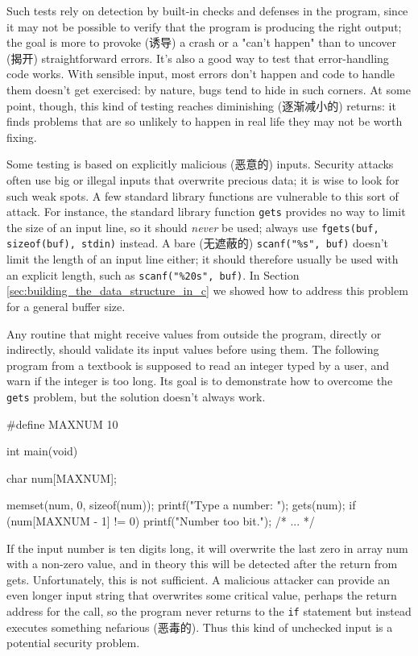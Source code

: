 Such tests rely on detection by built-in checks and defenses in the
program, since it may not be possible to verify that the program is
producing the right output; the goal is more to provoke (诱导) a crash or a
"can't happen" than to uncover (揭开) straightforward errors. It's also a
good way to test that error-handling code works. With sensible input, most
errors don't happen and code to handle them doesn't get exercised: by
nature, bugs tend to hide in such corners. At some point, though, this kind
of testing reaches diminishing (逐渐减小的) returns: it finds problems that
are so unlikely to happen in real life they may not be worth fixing.

Some testing is based on explicitly malicious (恶意的) inputs. Security
attacks often use big or illegal inputs that overwrite precious data; it is
wise to look for such weak spots. A few standard library functions are
vulnerable to this sort of attack. For instance, the standard library
function \verb'gets' provides no way to limit the size of an input line, so
it should \emph{never} be used; always use
\verb'fgets(buf, sizeof(buf), stdin)'
instead. A bare (无遮蔽的) \verb'scanf("%s", buf)' doesn't limit
the length of an input line either; it should therefore usually be used
with an explicit length, such as \verb'scanf("%20s", buf)'. In Section
\ref{sec:building_the_data_structure_in_c} we showed how to address this
problem for a general buffer size.

Any routine that might receive values from outside the program, directly or
indirectly, should validate its input values before using them. The
following program from a textbook is supposed to read an integer typed by a
user, and warn if the integer is too long. Its goal is to demonstrate how
to overcome the \texttt{gets} problem, but the solution doesn't always
work.
\begin{badcode}
    #define MAXNUM 10

    int main(void)
    {
        char    num[MAXNUM];

        memset(num, 0, sizeof(num));
        printf("Type a number: ");
        gets(num);
        if (num[MAXNUM - 1] != 0)
            printf("Number too bit.\n");
        /* ... */
    }
\end{badcode}
If the input number is ten digits long, it will overwrite the last zero in
array num with a non-zero value, and in theory this will be detected after
the return from gets. Unfortunately, this is not sufficient. A malicious
attacker can provide an even longer input string that overwrites some
critical value, perhaps the return address for the call, so the program
never returns to the \verb'if' statement but instead executes something
nefarious (恶毒的). Thus this kind of unchecked input is a potential
security problem.

